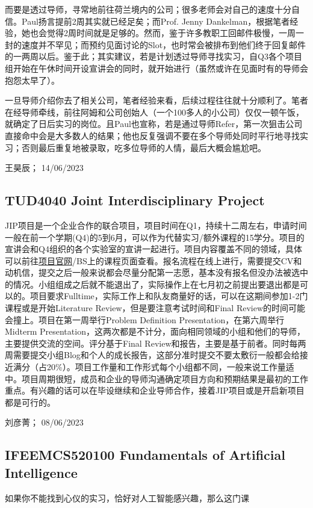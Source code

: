 而要是透过导师，寻常地前往荷兰境内的公司；很多老师会对自己的速度十分自信。Paul扬言提前2周其实就已经足矣；而Prof. Jenny Dankelman，根据笔者经验，她也会觉得2周时间就是足够的。然而，鉴于许多教职工回邮件极慢，一周一封的速度并不罕见；而预约见面讨论的Slot，也时常会被排布到他们终于回复邮件的一两周以后。鉴于此；其实建议，若是计划透过导师寻找实习，自Q3各个项目组开始在午休时间开设宣讲会的同时，就开始进行（虽然或许在见面时有的导师会抱怨太早了）。

一旦导师介绍你去了相关公司，笔者经验来看，后续过程往往就十分顺利了。笔者在经导师牵线，前往阿姆和公司创始人（一个100多人的小公司）仅仅一顿午饭，就确定了日后实习的岗位。且Paul也宣称，若是通过导师Refer，第一次狙击公司直接命中会是大多数人的结果；他也反复强调不要在多个导师处同时平行地寻找实习；否则最后重复地被录取，吃多位导师的人情，最后大概会尴尬吧。
\begin{flushright}
王昊辰； 14/06/2023
\end{flushright}

\subsection{TUD4040 Joint Interdisciplinary Project}
JIP项目是一个企业合作的联合项目，项目时间在Q1，持续十二周左右，申请时间一般在前一个学期(Q4)的5到6月，可以作为代替实习/额外课程的15学分。项目的宣讲会和Q4组织的各个实验室的宣讲一起进行。项目内容覆盖不同的领域，具体可以前往\href{https://www.jointinterdisciplinaryproject.nl/}{\uline{项目官网}}/BS上的课程页面查看。报名流程在线上进行，需要提交CV和动机信，提交之后一般来说都会尽量分配第一志愿，基本没有报名但没办法被选中的情况。小组组成之后就不能退出了，实际操作上在七月初之前提出要退出都是可以的。项目要求Fulltime，实际工作上和队友商量好的话，可以在这期间参加1-2门课程或是开始Literature Review，但是要注意考试时间和Final Review的时间可能会撞上。项目在第一周举行Problem Definition Presentation，在第六周举行Midterm Presentation，这两次都是不计分，面向相同领域的小组和他们的导师，主要提供交流的空间。评分基于Final Review和报告，主要是基于前者。同时每两周需要提交小组Blog和个人的成长报告，这部分准时提交不要太敷衍一般都会给接近满分（占20\%）。项目工作量和工作形式每个小组都不同，一般来说工作量适中。项目周期很短，成员和企业的导师沟通确定项目方向和预期结果是最初的工作重点。有兴趣的话可以在毕设继续和企业导师合作，接着JIP项目或是开启新项目都是可行的。

\begin{flushright}
刘彦菁； 08/06/2023
\end{flushright}
\subsection{IFEEMCS520100 Fundamentals of Artificial Intelligence}
如果你不能找到心仪的实习，恰好对人工智能感兴趣，那么这门课

